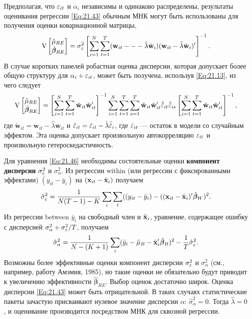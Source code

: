 Предполагая, что $\varepsilon_{it}$ и $\alpha_i$ независимы и одинаково распределены, результаты оценивания регрессии \ref{Eq:21.43} обычным МНК могут быть использованы для получения оценки ковариационной матрицы,
 \begin{align}
\mathrm V
\begin{bmatrix}
 \hat{\mu}_{RE} \\ \hat{\bm\beta}_{RE}
\end{bmatrix}
=
\sigma^2_\varepsilon
\left[ \sum^N_{i=1} \sum^T_{t=1} (\mathbf w_{it} --- \hat{\lambda} \bar{\mathbf w}_i)
 (\mathbf w_{it} -\hat{\lambda} \bar{\mathbf w}_i)' \right]^{-1}.
\label{Eq:21.46}
\end{align}
В случае коротких панелей робастная оценка дисперсии, которая допускает более общую структуру для $\alpha_i+\varepsilon_{it}$, может быть получена, используя \ref{Eq:21.13}, из чего следует
 \begin{align}
\mathrm V
\begin{bmatrix}
 \hat{\mu}_{RE} \\ \hat{\bm\beta}_{RE}
\end{bmatrix}
=
\left[ \sum^N_{i=1} \sum^T_{t=1} \tilde{\mathbf w}_{it} \tilde{\mathbf w}_{it}' \right]^{-1}
\sum^N_{i=1} \sum^T_{t=1} \sum^T_{s=1} \tilde{\mathbf w}_{it} \tilde{\mathbf w}_{it}' \hat{\tilde{\varepsilon}}_{it} \hat{\tilde{\varepsilon}}_{is}
\left[ \sum^N_{i=1} \sum^T_{t=1} \tilde{\mathbf w}_{it} \tilde{\mathbf w}_{it}' \right]^{-1},
\label{Eq:21.47}
\end{align}
где $\tilde{\mathbf w}_{it}=\mathbf w_{it} -\hat{\lambda} \bar{\mathbf w}_{it}$ и $\tilde{\varepsilon}_{it}=\hat{\varepsilon}_{it}-\hat{\lambda}\bar{\hat{\varepsilon}}_i$, где $\hat{\varepsilon}_{it}$ --- остаток в модели со случайным эффектом. Эта оценка допускает произвольную автокорреляцию $\varepsilon_{it}$ и произвольную гетероскедастичность.

Для уравнения \ref{Eq:21.46} необходимы состоятельные оценки \textbf{компонент дисперсии} $\sigma^2_\varepsilon$ и $\sigma^2_\alpha$. Из регрессии within (или регрессии с фиксированными эффектами) $(y_{it}-\bar{y}_i)$ на $(\mathbf{x}_{it}-\bar{\mathbf{x}}_i)$ получаем
 \begin{align}
\hat{\sigma}^2_\varepsilon=\frac{1}{N(T-1)-K}
\sum_i \sum_t ((y_{it}-\bar{y}_i)-((\mathbf{x}_{it}-\bar{\mathbf{x}}_i)'\hat{\bm\beta}_W)^2.
\label{Eq:21.48}
\end{align}
Из регрессии between $\bar{y}_i$ на свободный член и $\bar{\mathbf{x}}_i$, уравнение, содержащее ошибку с дисперсией $\sigma^2_\alpha+\sigma^2_\varepsilon/T$, получаем
 \begin{align}
\hat{\sigma}^2_\alpha=\frac{1}{N-(K+1)}
\sum_i  (\bar{y}_{i}-\hat{\mu}_B-\bar{\mathbf{x}}'_i\hat{\bm\beta}_B)^2-\frac{1}{T}\hat{\sigma}^2_\varepsilon.
\label{Eq:21.49}
\end{align}
Возможны более эффективные оценки компонент дисперсии $\sigma^2_\varepsilon$ и $\sigma^2_\alpha$ (см., например, работу Амэмия, 1985), но такие оценки не обязательно будут приводит к увеличению эффективности $\hat{\bm\beta}_{RE}$. Выбор оценок достаточно широк. Оценка дисперсии \ref{Eq:21.43} может быть отрицательной. В таких случаях статистические пакеты зачастую присваивают нулевое значение дисперсии $\alpha$: $\hat{\sigma}^2_{\alpha}=0$. Тогда $\hat{\lambda}=0$, и оценивание производится посредством МНК для сквозной регрессии.

